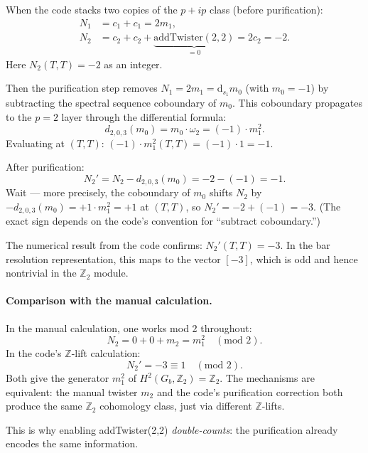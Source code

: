 \documentclass{SciPost}
\begin{document}
When the code stacks two copies of the $p+ip$ class (before purification):
\begin{align}
N_1 &= c_1 + c_1 = 2m_1, \\
N_2 &= c_2 + c_2 + \underbrace{\mathrm{addTwister}(2,2)}_{= 0} = 2c_2 = -2.
\end{align}
Here $N_2(T,T) = -2$ as an integer.

Then the purification step removes $N_1 = 2m_1 = \mathrm{d}_{s_1} m_0$ (with $m_0 = -1$) by subtracting the spectral sequence coboundary of $m_0$.
This coboundary propagates to the $p=2$ layer through the differential formula:
\begin{equation}
d_{2,0,3}(m_0) = m_0 \cdot \omega_2 = (-1) \cdot m_1^2.
\end{equation}
Evaluating at $(T,T)$: $(-1) \cdot m_1^2(T,T) = (-1) \cdot 1 = -1$.

After purification:
\begin{equation}
N_2' = N_2 - d_{2,0,3}(m_0) = -2 - (-1) = -1.
\end{equation}
Wait --- more precisely, the coboundary of $m_0$ shifts $N_2$ by $-d_{2,0,3}(m_0) = +1 \cdot m_1^2 = +1$ at $(T,T)$, 
so $N_2' = -2 + (-1) = -3$.
(The exact sign depends on the code's convention for ``subtract coboundary.'')

The numerical result from the code confirms: $N_2'(T,T) = -3$.
In the bar resolution representation, this maps to the vector $[-3]$, which is odd and hence nontrivial in the $\mathbb{Z}_2$ module.

\paragraph{Comparison with the manual calculation.}
In the manual calculation, one works mod 2 throughout:
\begin{equation}
N_2 = 0 + 0 + m_2 = m_1^2 \quad (\text{mod } 2).
\end{equation}
In the code's $\mathbb{Z}$-lift calculation:
\begin{equation}
N_2' = -3 \equiv 1 \quad (\text{mod } 2).
\end{equation}
Both give the generator $m_1^2$ of $H^2(G_b, \mathbb{Z}_2) = \mathbb{Z}_2$.
The mechanisms are equivalent: the manual twister $m_2$ and the code's purification correction both produce the same $\mathbb{Z}_2$ cohomology class, just via different $\mathbb{Z}$-lifts.

This is why enabling addTwister(2,2) \emph{double-counts}: the purification already encodes the same information.
\end{document}
